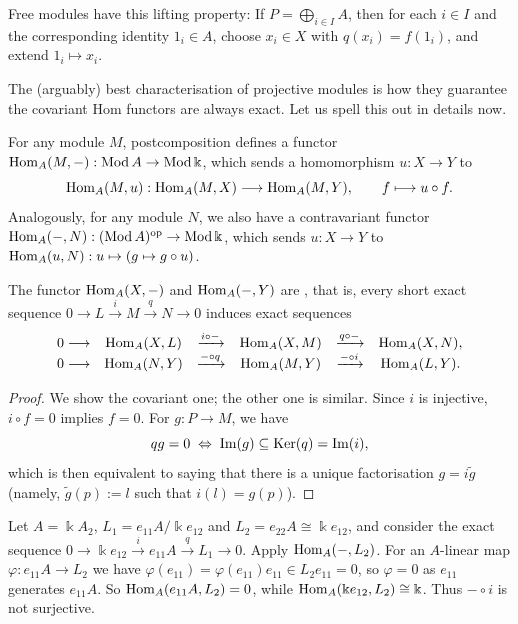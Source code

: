 \begin{example}
Free modules have this lifting property: If $P=\bigoplus_{i\in I}A$, then for each $i\in I$ and the corresponding identity $1_i\in A$, choose $x_i\in X$ with $q(x_i)=f(1_i)$, and extend $1_i\mapsto x_i$.
\end{example}

The (arguably) best characterisation of projective modules is how they guarantee the covariant Hom functors are always exact.  Let us spell this out in details now.

For any module $M$, postcomposition defines a functor $\operatorname{Hom}\nolimits_A(M,-):\operatorname{\mathrm{Mod}} A\to\operatorname{\mathrm{Mod}}\Bbbk$, which sends a homomorphism $u:X\to Y$ to
\[
\operatorname{Hom}\nolimits_A(M,u):\operatorname{Hom}\nolimits_A(M,X)\longrightarrow\operatorname{Hom}\nolimits_A(M,Y),
\qquad f\longmapsto u\circ f .
\]
Analogously, for any module $N$, we also have a contravariant functor $\operatorname{Hom}\nolimits_A(-,N):(\operatorname{\mathrm{Mod}} A)^{\mathrm{op}}\to \operatorname{\mathrm{Mod}} \Bbbk $, which sends $u:X\to Y$ to $\operatorname{Hom}\nolimits_A(u,N):u\mapsto(g\mapsto g\circ u)$.

\begin{lemma}\label{lem:Hom-left-exact}
The functor $\operatorname{Hom}\nolimits_A(X,-)$ and $\operatorname{Hom}\nolimits_A(-,Y)$ are , that is, every short exact sequence $0\to L\xrightarrow{i}M\xrightarrow{q}N\to0$ induces  exact sequences
\[
\begin{array}{rccccc}
0 \longrightarrow &\operatorname{Hom}\nolimits_A(X,L) &\xrightarrow{i\circ-}&
\operatorname{Hom}\nolimits_A(X,M) &\xrightarrow{q\circ-} &\operatorname{Hom}\nolimits_A(X,N),\\
0 \longrightarrow &\operatorname{Hom}\nolimits_A(N,Y) &\xrightarrow{-\circ q}&
\operatorname{Hom}\nolimits_A(M,Y) &\xrightarrow{-\circ i} &\operatorname{Hom}\nolimits_A(L,Y).
\end{array}
\]
\end{lemma}

\begin{supplementary}
\begin{proof}
We show the covariant one; the other one is similar.
Since $i$ is injective, $i\circ f=0$ implies $f=0$.
For $g:P\to M$, we have
\[
qg =0 \;\Leftrightarrow\; \operatorname{Im}\nolimits(g)\subseteq \operatorname{Ker}\nolimits(q)=\operatorname{Im}\nolimits(i),
\] which is then equivalent to saying that there is a unique factorisation $g=i\widetilde g$ (namely, $\widetilde{g}(p):=l$ such that $i(l)=g(p)$).
\end{proof}

\begin{example}\label{ex:Hom-contravariant-not-exact}
Let $A=\Bbbk A_2$, $L_1=e_{11}A/\Bbbk e_{12}$ and $L_2=e_{22}A\cong\Bbbk e_{12}$, and consider the exact sequence $0\to\Bbbk e_{12}\xrightarrow{i}e_{11}A\xrightarrow{q}L_1\to0$.
Apply $\operatorname{Hom}\nolimits_A(-,L_2)$.
For an $A$-linear map $\varphi:e_{11}A\to L_2$ we have $\varphi(e_{11})=\varphi(e_{11})e_{11}\in L_2e_{11}=0$, so $\varphi=0$ as $e_{11}$ generates $e_{11}A$.
So $\operatorname{Hom}\nolimits_A(e_{11}A,L_2)=0$, while $\operatorname{Hom}\nolimits_A(\Bbbk e_{12},L_2)\cong\Bbbk$.
Thus $-\circ i$ is not surjective.
\end{example}
\end{supplementary}



